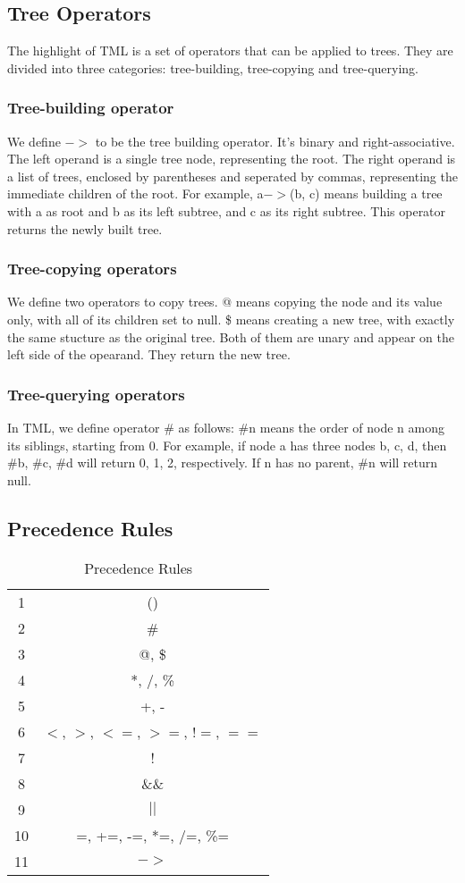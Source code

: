 \documentclass[12pt,psfig,a4]{article}
\begin{document}
\subsection{Tree Operators}
The highlight of TML is a set of operators that can be applied to trees. They are divided into three categories: tree-building, tree-copying and tree-querying.

\subsubsection{Tree-building operator}
We define $->$ to be the tree building operator. It's binary and right-associative. The left operand is a single tree node, representing the root. The right operand is a list of trees, enclosed by parentheses and seperated by commas, representing the immediate children of the root. For example, a$->$(b, c) means building a tree with a as root and b as its left subtree, and c as its right subtree. This operator returns the newly built tree.

\subsubsection{Tree-copying operators}
We define two operators to copy trees. @ means copying the node and its value only, with all of its children set to null. \$ means creating a new tree, with exactly the same stucture as the original tree. Both of them are unary and appear on the left side of the opearand. They return the new tree.

\subsubsection{Tree-querying operators}
In TML, we define operator \# as follows: \#n means the order of node n among its siblings, starting from 0. For example, if node a has three nodes b, c, d, then \#b, \#c, \#d will return 0, 1, 2, respectively. If n has no parent, \#n will return null.

\subsection{Precedence Rules}
\begin{table}[ht]
\begin{center}
\begin{tabular}{| c | c |}
\hline
1 & () \\
2 & \# \\
3 & @, \$ \\
4 & *, /, \% \\
5 & +, - \\
6 & $<$, $>$, $<=$, $>=$, $!=$, $==$ \\
7 & ! \\
8 & \&\& \\
9 & $||$ \\
10 & =, +=, -=, *=, /=, \%= \\
11 & $->$ \\
\hline
\end{tabular}
\caption{Precedence Rules}
\label{keywords}
\end {center}
\end{table}
\end{document}
